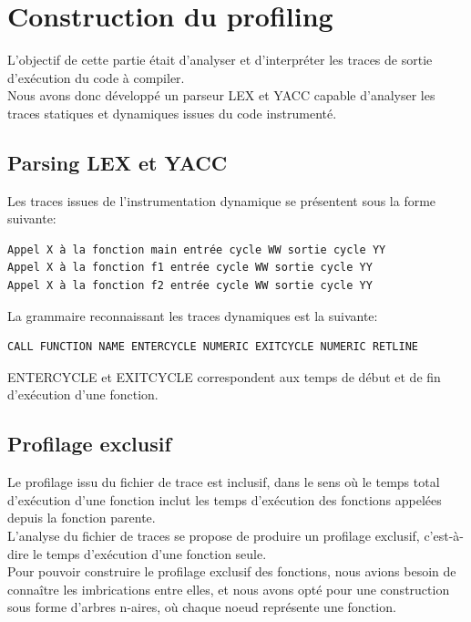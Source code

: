 \section{Construction du profiling}

L'objectif de cette partie était d'analyser et d'interpréter les traces de sortie d'exécution du code à compiler.\\

Nous avons donc développé un parseur LEX et YACC capable d'analyser les traces statiques et dynamiques issues du code instrumenté.\\

\subsection{Parsing LEX et YACC}

Les traces issues de l'instrumentation dynamique se présentent sous la forme suivante:
\begin{verbatim}
Appel X à la fonction main entrée cycle WW sortie cycle YY
Appel X à la fonction f1 entrée cycle WW sortie cycle YY
Appel X à la fonction f2 entrée cycle WW sortie cycle YY
\end{verbatim}

La grammaire reconnaissant les traces dynamiques est la suivante:
\begin{verbatim}
CALL FUNCTION NAME ENTERCYCLE NUMERIC EXITCYCLE NUMERIC RETLINE
\end{verbatim}

ENTERCYCLE et EXITCYCLE correspondent aux temps de début et de fin d'exécution d'une fonction.\\

\subsection{Profilage exclusif}

Le profilage issu du fichier de trace est inclusif, dans le sens où le temps total d'exécution d'une fonction inclut les temps d'exécution des fonctions appelées depuis la fonction parente.\\
L'analyse du fichier de traces se propose de produire un profilage exclusif, c'est-à-dire le temps d'exécution d'une fonction seule.\\

Pour pouvoir construire le profilage exclusif des fonctions, nous avions besoin de connaître les imbrications entre elles, et nous avons opté pour une construction sous forme d'arbres n-aires, où chaque noeud représente une fonction.\\

